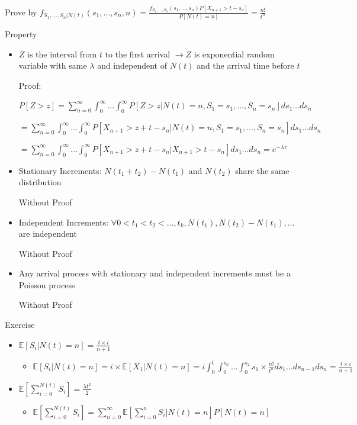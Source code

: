 \documentclass[a4paper]{article}
\begin{document}
\begin{itemize}
\begin{itemize}
\begin{itemize}
                        Prove by $f_{S_1, \dots, S_n | N(t)}(s_1, \dots, s_n, n) = \frac{f_{S_1, \dots, S_n}(s_1, \dots, s_n) P[X_{n+1} > t - s_n]}{P[N(t) = n]} = \frac{n!}{t^n}$
                \end{itemize}
                Property
                \begin{itemize}
                    \item $Z$ is the interval from $t$ to the first arrival $\rightarrow Z$ is exponential random variable with same $\lambda$ and independent of $N(t)$ and the arrival time before $t$

                        Proof:

                        $P[Z > z] = \sum_{n = 0}^\infty \int_0^\infty \dots \int_0^\infty P[Z>z|N(t) = n, S_1 = s_1, \dots, S_n = s_n] ds_1 \dots ds_n$

                        $= \sum_{n = 0}^\infty \int_0^\infty \dots \int_0^\infty P[X_{n+1}>z+t-s_n|N(t) = n, S_1 = s_1, \dots, S_n = s_n] ds_1 \dots ds_n$

                        $= \sum_{n = 0}^\infty \int_0^\infty \dots \int_0^\infty P[X_{n+1}>z+t-s_n|X_{n+1} > t-s_n] ds_1 \dots ds_n = e^{-\lambda z}$
                    \item Stationary Increments: $N(t_1 + t_2) - N(t_1)$ and $N(t_2)$ share the same distribution

                        Without Proof
                    \item Independent Increments: $\forall 0 < t_1 < t_2 < \dots, t_k, N(t_1), N(t_2) - N(t_1), \dots$ are independent

                        Without Proof
                    \item Any arrival process with stationary and independent increments must be a Poisson process

                        Without Proof
                \end{itemize}
                Exercise
                \begin{itemize}
                    \item $\mathbb{E}[S_i|N(t) = n] = \frac{t \times i}{n+1}$
                        \begin{itemize}
                            \item $\mathbb{E}[S_i|N(t) = n] = i \times \mathbb{E}[X_1|N(t) = n] = i \int_0^t \int_0^{s_n} \dots \int_0^{s_2} s_1 \times \frac{n!}{t^n} ds_1 \dots ds_{n-1} ds_n = \frac{t \times i}{n+1}$
                        \end{itemize}
                    \item $\mathbb{E}[\sum_{i=0}^{N(t)} S_i] = \frac{\lambda t^2}{2}$
                        \begin{itemize}
                            \item $\mathbb{E}[\sum_{i=0}^{N(t)} S_i] = \sum_{n = 0}^\infty \mathbb{E}[\sum_{i=0}^n S_i|N(t) = n]P[N(t) = n]$


\end{itemize}
\end{itemize}
\end{itemize}
\end{itemize}
\end{document}
